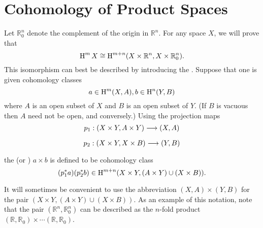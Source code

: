 \documentclass[../main]{subfiles}
\begin{document}
\section{Cohomology of Product Spaces}\label{sec:A.5}
Let $\mathbb{R}_0^n$ denote the complement of the origin in $\mathbb{R}^n$. For any space $X$, we will prove that \[\operatorname{H}^m X \cong \operatorname{H}^{m+n}(X\times \mathbb{R}^n, X \times \mathbb{R}_0 ^n).\] This isomorphism can best be described by introducing the . Suppose that one is given cohomology classes \[a \in \operatorname{H}^m (X, A), b\in \operatorname{H}^n (Y, B)\] where $A$ is an open subset of $X$ and $B$ is an open subset of $Y$. (If $B$ is vacuous then $A$ need not be open, and conversely.) Using the projection maps \[p_1:(X\times Y, A\times Y) \varrightarrow{} (X, A)\] \[p_2: (X \times Y, X\times B) \varrightarrow{} (Y, B)\] the  (or ) $a\times b$ is defined to be cohomology class \[(p_1^* a)(p_2^* b) \in \operatorname{H}^{m+n} (X\times Y, (A \times Y)\cup (X\times B)).\]

It will sometimes be convenient to use the abbreviation $(X, A)\times (Y, B)$ for the pair $(X\times Y, (A\times Y)\cup (X\times B))$. As an example of this notation, note that the pair $(\mathbb{R}^n , \mathbb{R}_0^n)$ can be described as the $n$-fold product $(\mathbb{R}, \mathbb{R}_0)\times \cdots (\mathbb{R}, \mathbb{R}_0)$.
\end{document}
